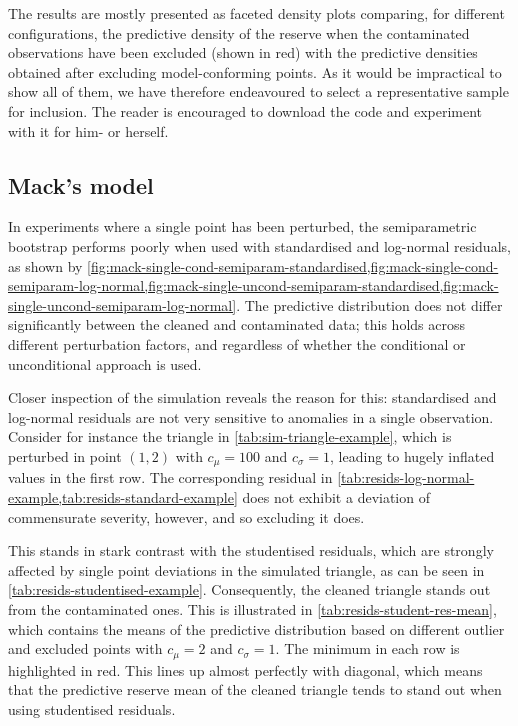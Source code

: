 \documentclass[a4paper]{book}
\begin{document}
The results are mostly presented as faceted density plots comparing, for different configurations, the predictive density of the reserve when the contaminated observations have been excluded (shown in red) with the predictive densities obtained after excluding model-conforming points. As it would be impractical to show all of them, we have therefore endeavoured to select a representative sample for inclusion. The reader is encouraged to download the code and experiment with it for him- or herself.

\subsection{Mack's model} \label{subsec:mack-sim-res}

In experiments where a single point has been perturbed, the semiparametric bootstrap performs poorly when used with standardised and log-normal residuals, as shown by \cref{fig:mack-single-cond-semiparam-standardised,fig:mack-single-cond-semiparam-log-normal,fig:mack-single-uncond-semiparam-standardised,fig:mack-single-uncond-semiparam-log-normal}. The predictive distribution does not differ significantly between the cleaned and contaminated data; this holds across different perturbation factors, and regardless of whether the conditional or unconditional approach is used.

Closer inspection of the simulation reveals the reason for this: standardised and log-normal residuals are not very sensitive to anomalies in a single observation. Consider for instance the triangle in \cref{tab:sim-triangle-example}, which is perturbed in point $(1, 2)$ with $c_\mu = 100$ and $c_\sigma = 1$, leading to hugely inflated values in the first row. The corresponding residual in \cref{tab:resids-log-normal-example,tab:resids-standard-example} does not exhibit a deviation of commensurate severity, however, and so excluding it does.

This stands in stark contrast with the studentised residuals, which are strongly affected by single point deviations in the simulated triangle, as can be seen in \cref{tab:resids-studentised-example}. Consequently, the cleaned triangle stands out from the contaminated ones. This is illustrated in \cref{tab:resids-student-res-mean}, which contains the means of the predictive distribution based on different outlier and excluded points with $c_\mu = 2$ and $c_\sigma = 1$. The minimum in each row is highlighted in red. This lines up almost perfectly with diagonal, which means that the predictive reserve mean of the cleaned triangle tends to stand out when using studentised residuals.
\end{document}
